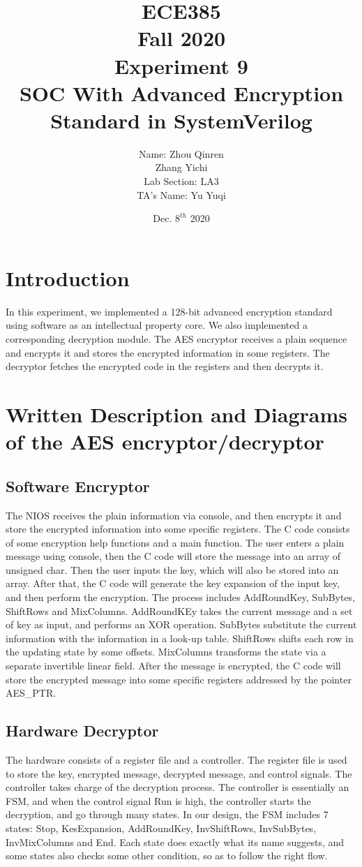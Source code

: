 \documentclass[12pt]{article}
\title{
    \textbf{\Huge ECE385} \\
    \huge Fall 2020 \\
    \huge Experiment 9 \\[120pt]
    \textbf{\Huge SOC With Advanced Encryption Standard in SystemVerilog} \\[120pt]
    }
\author{
    \large Name: Zhou Qinren \\ 
            \quad\qquad Zhang Yichi \\
    \large Lab Section: LA3 \\
    \large TA's Name: Yu Yuqi
    }
\date{Dec. $8^{th}$ 2020}
\begin{document}
\setlength{\parindent}{0pt}
\maketitle
\newpage

\section{Introduction}
In this experiment, we implemented a 128-bit advanced encryption standard using software as an intellectual property core. We also implemented a corresponding decryption module. The AES encryptor receives a plain sequence and encrypts it and stores the encrypted information in some registers. The decryptor fetches the encrypted code in the registers and then decrypts it. 

\section{Written Description and Diagrams of the AES encryptor/decryptor}
\subsection{Software Encryptor}
The NIOS receives the plain information via console, and then encrypts it and store the encrypted information into some specific registers. The C code consists of some encryption help functions and a main function. The user enters a plain message using console, then the C code will store the message into an array of unsigned char. Then the user inputs the key, which will also be stored into an array. After that, the C code will generate the key expansion of the input key, and then perform the encryption. The process includes AddRoundKey, SubBytes, ShiftRows and MixColumns. AddRoundKEy takes the current message and a set of key as input, and performs an XOR operation. SubBytes substitute the current information with the information in a look-up table. ShiftRows shifts each row in the updating state by some offsets. MixColumns transforms the state via a separate invertible linear field. After the message is encrypted, the C code will store the encrypted message into some specific registers addressed by the pointer AES\_PTR.

\subsection{Hardware Decryptor}
The hardware consists of a register file and a controller. The register file is used to store the key, encrypted message, decrypted message, and control signals. The controller takes charge of the decryption process. The controller is essentially an FSM, and when the control signal Run is high, the controller starts the decryption, and go through many states. In our design, the FSM includes 7 states: Stop, KesExpansion, AddRoundKey, InvShiftRows, InvSubBytes, InvMixColumns and End. Each state does exactly what its name suggests, and some states also checks some other condition, so as to follow the right flow. 
\end{document}
